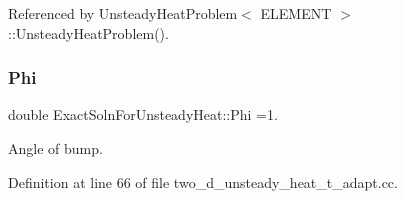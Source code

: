 Referenced by Unsteady\+Heat\+Problem$<$ E\+L\+E\+M\+E\+N\+T $>$\+::\+Unsteady\+Heat\+Problem().

\mbox{\label{namespaceExactSolnForUnsteadyHeat_a630f9e8d892cfcc41cdaef25bfc87ca1}} 
\subsubsection{\texorpdfstring{Phi}{Phi}}
{\footnotesize\ttfamily double Exact\+Soln\+For\+Unsteady\+Heat\+::\+Phi =1.}



Angle of bump. 



Definition at line 66 of file two\+\_\+d\+\_\+unsteady\+\_\+heat\+\_\+t\+\_\+adapt.\+cc.

